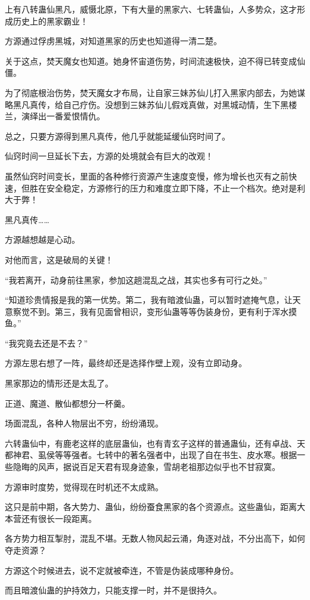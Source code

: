 \begin{this_body}
上有八转蛊仙黑凡，威慑北原，下有大量的黑家六、七转蛊仙，人多势众，这才形成历史上的黑家霸业！

方源通过俘虏黑城，对知道黑家的历史也知道得一清二楚。

关于这点，焚天魔女也知道。她身怀宙道伤势，时间流速极快，迫不得已转变成仙僵。

为了彻底根治伤势，焚天魔女才布局，让自家三妹苏仙儿打入黑家内部去，为她谋略黑凡真传，给自己疗伤。没想到三妹苏仙儿假戏真做，对黑城动情，生下黑楼兰，演绎出一番爱恨情仇。

总之，只要方源得到黑凡真传，他几乎就能延缓仙窍时间了。

仙窍时间一旦延长下去，方源的处境就会有巨大的改观！

虽然仙窍时间变长，里面的各种修行资源产生速度变慢，修为增长也灭有之前快速，但胜在安全稳定，方源修行的压力和难度立即下降，不止一个档次。绝对是利大于弊！

黑凡真传……

方源越想越是心动。

对他而言，这是破局的关键！

“我若离开，动身前往黑家，参加这趟混乱之战，其实也多有可行之处。”

“知道珍贵情报是我的第一优势。第二，我有暗渡仙蛊，可以暂时遮掩气息，让天意察觉不到。第三，我有见面曾相识，变形仙蛊等等伪装身份，更有利于浑水摸鱼。”

“我究竟去还是不去？”

方源左思右想了一阵，最终却还是选择作壁上观，没有立即动身。

黑家那边的情形还是太乱了。

正道、魔道、散仙都想分一杯羹。

场面混乱，各种人物层出不穷，纷纷涌现。

六转蛊仙中，有鹿老这样的底层蛊仙，也有青玄子这样的普通蛊仙，还有卓战、天都神君、虱侯等等强者。七转中的著名强者中，出现了自在书生、皮水寒。根据一些隐晦的风声，据说百足天君有现身迹象，雪胡老祖那边似乎也不甘寂寞。

方源审时度势，觉得现在时机还不太成熟。

这只是前中期，各大势力、蛊仙，纷纷蚕食黑家的各个资源点。这些蛊仙，距离大本营还有很长一段距离。

各方势力相互掣肘，混乱不堪。无数人物风起云涌，角逐对战，不分出高下，如何夺走资源？

方源这个时候进去，说不定就被牵连，不管是伪装成哪种身份。

而且暗渡仙蛊的护持效力，只能支撑一时，并不是很持久。


\end{this_body}
